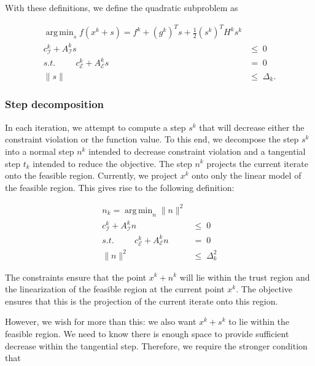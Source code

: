 \documentclass{article}
\DeclareMathOperator*{\argmin}{arg\,min}
\begin{document}
With these definitions, we define the quadratic subproblem as

\begin{align*}
\argmin_s  f(x^k+s) = f^k + (g^k)^Ts + \frac 1 2 (s^k)^T H^ks^k  &\\
     c_{{\mathcal{I}}}^k + A_{{\mathcal{I}}}^ks       &\le \; 0  \\
s.t. \hspace{1cm} c_{{\mathcal{E}}}^k + A_{{\mathcal{E}}}^ks           &=\; 0 \\
     \| s \|                      &\le \; \Delta_k.
\end{align*}



\subsubsection{Step decomposition}
In each iteration, we attempt to compute a step $s^k$ that will decrease either the constraint violation or the function value. 
To this end, we decompose the step $s^k$ into a normal step $n^k$ intended to decrease constraint violation and a tangential step $t_k$ intended to reduce the objective.
The step $n^k$ projects the current iterate onto the feasible region.
Currently, we project $x^k$ onto only the linear model of the feasible region.
This gives rise to the following definition:

\begin{align}
\label{normal}
 n_k = \argmin_n            \|n\|^2    &\\
     c_{{\mathcal{I}}}^k + A_{{\mathcal{I}}}^kn       &\le \; 0  \nonumber \\
s.t. \hspace{1cm} c_{{\mathcal{E}}}^k + A_{{\mathcal{E}}}^kn           &=\; 0 \nonumber \\
     \| n \|^2                      &\le \; \Delta_k^2
\end{align}

The constraints ensure that the point $x^k + n^k$ will lie within the trust region and the linearization of the feasible region at the current point $x^k$.
The objective ensures that this is the projection of the current iterate onto this region.

However, we wish for more than this: we also want $x^k + s^k$ to lie within the feasible region.
We need to know there is enough space to provide sufficient decrease within the tangential step.
Therefore, we require the stronger condition that
\end{document}
